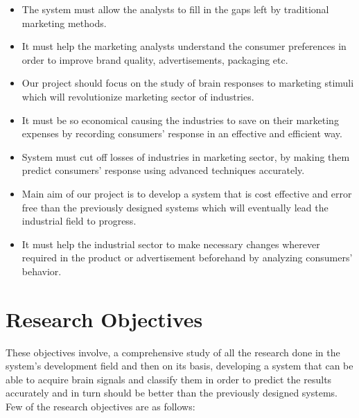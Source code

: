\documentclass[a4paper, 12pt, oneside]{uet_thesis}
\begin{document}
\begin{itemize}
\item The system must allow the analysts to fill in the gaps left by traditional marketing methods.
\item It must help the marketing analysts understand the consumer preferences in order to improve brand quality, advertisements, packaging etc.
\item Our project should focus on the study of brain responses to marketing stimuli which will revolutionize marketing sector of industries.
\item It must be so economical causing the industries to save on their marketing expenses by recording consumers’ response in an effective and efficient way\cite{b7}.
\item System must cut off losses of industries in marketing sector, by making them predict consumers’ response using advanced techniques accurately.
\item Main aim of our project is to develop a system that is cost effective and error free than the previously designed systems which will eventually lead the industrial field to progress\cite{b8}.
\item It must help the industrial sector to make necessary changes wherever required in the product or advertisement beforehand by analyzing consumers’ behavior.
\end{itemize}

\section{Research Objectives}
These objectives involve, a comprehensive study of all the research done in the system’s development field and then on its basis, developing a system that can be able to acquire brain signals and classify them in order to predict the results accurately and in turn should be better than the previously designed systems\cite{b9}. Few of the research objectives are as follows:
\end{document}
